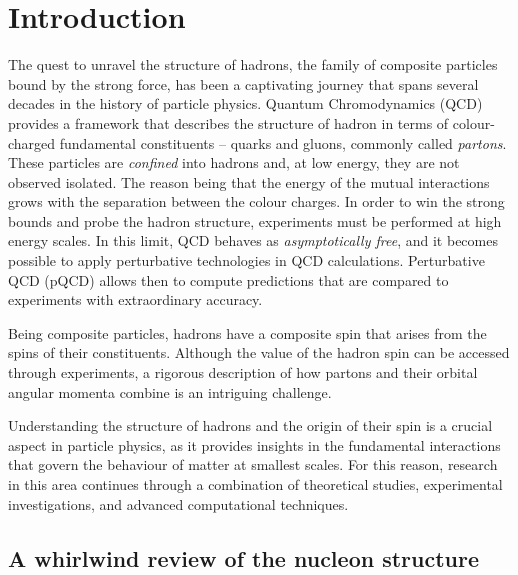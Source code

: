 \chapter{Introduction}
\label{ch:1}

The quest to unravel the structure of hadrons, the family of composite particles bound by the strong force, has been a captivating journey that spans several decades in the history of particle physics. Quantum Chromodynamics (QCD) provides a framework that describes the structure of hadron in terms of colour-charged fundamental constituents -- quarks and gluons, commonly called \textit{partons}. These particles are \textit{confined} into hadrons and, at low energy, they are not observed isolated. The reason being that the energy of the mutual interactions grows with the separation between the colour charges. In order to win the strong bounds and probe the hadron structure, experiments must be performed at high energy scales. In this limit, QCD  behaves as \textit{asymptotically free}, and it becomes possible to apply perturbative technologies in QCD calculations. Perturbative QCD (pQCD) allows then to compute predictions that are compared to experiments with extraordinary accuracy.%

Being composite particles, hadrons have a composite spin that arises from the spins of their constituents. Although the value of the hadron spin can be accessed through experiments, a rigorous description of how partons and their orbital angular momenta combine is an intriguing challenge.%

Understanding the structure of hadrons and the origin of their spin is a crucial aspect in particle physics, as it provides insights in the fundamental interactions that govern the behaviour of matter at smallest scales. For this reason, research in this area continues through a combination of theoretical studies, experimental investigations, and advanced computational techniques. 


\section{A whirlwind review of the nucleon structure}

